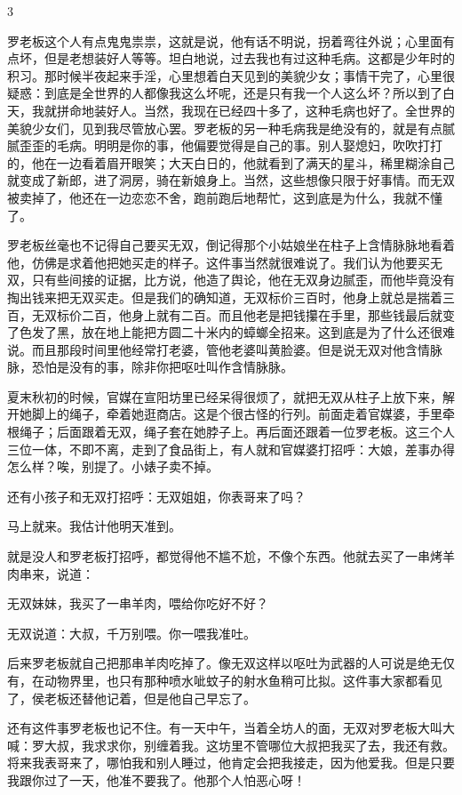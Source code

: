 3 

罗老板这个人有点鬼鬼祟祟，这就是说，他有话不明说，拐着弯往外说；心里面有点坏，但是老想装好人等等。坦白地说，过去我也有过这种毛病。这都是少年时的积习。那时候半夜起来手淫，心里想着白天见到的美貌少女；事情干完了，心里很疑惑：到底是全世界的人都像我这么坏呢，还是只有我一个人这么坏？所以到了白天，我就拼命地装好人。当然，我现在已经四十多了，这种毛病也好了。全世界的美貌少女们，见到我尽管放心罢。罗老板的另一种毛病我是绝没有的，就是有点腻腻歪歪的毛病。明明是你的事，他偏要觉得是自己的事。别人娶熄妇，吹吹打打的，他在一边看着眉开眼笑；大天白日的，他就看到了满天的星斗，稀里糊涂自己就变成了新郎，进了洞房，骑在新娘身上。当然，这些想像只限于好事情。而无双被卖掉了，他还在一边恋恋不舍，跑前跑后地帮忙，这到底是为什么，我就不懂了。 

罗老板丝毫也不记得自己要买无双，倒记得那个小姑娘坐在柱子上含情脉脉地看着他，仿佛是求着他把她买走的样子。这件事当然就很难说了。我们认为他要买无双，只有些间接的证据，比方说，他造了舆论，他在无双身边腻歪，而他毕竟没有掏出钱来把无双买走。但是我们的确知道，无双标价三百时，他身上就总是揣着三百，无双标价二百，他身上就有二百。而且他老是把钱攥在手里，那些钱最后就变了色发了黑，放在地上能把方圆二十米内的蟑螂全招来。这到底是为了什么还很难说。而且那段时间里他经常打老婆，管他老婆叫黄脸婆。但是说无双对他含情脉脉，恐怕是没有的事，除非你把呕吐叫作含情脉脉。 

夏末秋初的时候，官媒在宣阳坊里已经呆得很烦了，就把无双从柱子上放下来，解开她脚上的绳子，牵着她逛商店。这是个很古怪的行列。前面走着官媒婆，手里牵根绳子；后面跟着无双，绳子套在她脖子上。再后面还跟着一位罗老板。这三个人三位一体，不即不离，走到了食品街上，有人就和官媒婆打招呼：大娘，差事办得怎么样？唉，别提了。小婊子卖不掉。 

还有小孩子和无双打招呼：无双姐姐，你表哥来了吗？ 

马上就来。我估计他明天准到。 

就是没人和罗老板打招呼，都觉得他不尴不尬，不像个东西。他就去买了一串烤羊肉串来，说道： 

无双妹妹，我买了一串羊肉，喂给你吃好不好？ 

无双说道：大叔，千万别喂。你一喂我准吐。 

后来罗老板就自己把那串羊肉吃掉了。像无双这样以呕吐为武器的人可说是绝无仅有，在动物界里，也只有那种喷水呲蚊子的射水鱼稍可比拟。这件事大家都看见了，侯老板还替他记着，但是他自己早忘了。 

还有这件事罗老板也记不住。有一天中午，当着全坊人的面，无双对罗老板大叫大喊：罗大叔，我求求你，别缠着我。这坊里不管哪位大叔把我买了去，我还有救。将来我表哥来了，哪怕我和别人睡过，他肯定会把我接走，因为他爱我。但是只要我跟你过了一天，他准不要我了。他那个人怕恶心呀！ 

